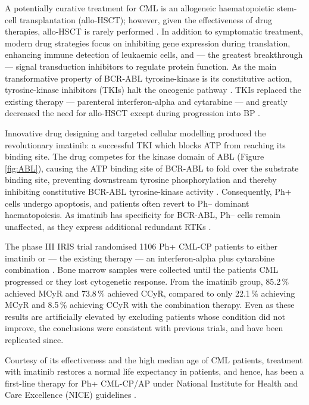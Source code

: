 A potentially curative treatment for CML is an allogeneic haematopoietic stem-cell transplantation (allo-HSCT); however, given the effectiveness of drug therapies, allo-HSCT is rarely performed \citep{RefWorks:doc:583b173fe4b066125b214e79}. In addition to symptomatic treatment, modern drug strategies focus on inhibiting gene expression during translation, enhancing immune detection of leukaemic cells, and --- the greatest breakthrough --- signal transduction inhibitors to regulate protein function. As the main transformative property of BCR-ABL tyrosine-kinase is its constitutive action, tyrosine-kinase inhibitors (TKIs) halt the oncogenic pathway \citep{RefWorks:doc:58309926e4b05b192d72d473}. TKIs replaced the existing therapy --- parenteral interferon-alpha and cytarabine --- and greatly decreased the need for allo-HSCT except during progression into BP \citep{RefWorks:doc:583b5609e4b066125b215900}.

Innovative drug designing and targeted cellular modelling produced the revolutionary imatinib: a successful TKI which blocks ATP from reaching its binding site. The drug competes for the kinase domain of ABL (Figure \ref{fig:ABL}), causing the ATP binding site of BCR-ABL to fold over the substrate binding site, preventing downstream tyrosine phosphorylation and thereby inhibiting constitutive BCR-ABL tyrosine-kinase activity \citep{RefWorks:doc:583b01e7e4b04961d3592edb}. Consequently, Ph+ cells undergo apoptosis, and patients often revert to Ph-- dominant haematopoiesis. As imatinib has specificity for BCR-ABL, Ph-- cells remain unaffected, as they express additional redundant RTKs \citep{RefWorks:doc:583b5731e4b066125b21592c}.

The phase III IRIS trial randomised 1106 Ph+ CML-CP patients to either imatinib or --- the existing therapy --- an interferon-alpha plus cytarabine combination \citep{RefWorks:doc:585b3fdee4b05e0ea0615992}. Bone marrow samples were collected until the patient\textquotesingle s CML progressed or they lost cytogenetic response. From the imatinib group, 85.2\,\% achieved MCyR and 73.8\,\% achieved CCyR, compared to only 22.1\,\% achieving MCyR and 8.5\,\% achieving CCyR with the combination therapy. Even as these results are artificially elevated by excluding patients whose condition did not improve, the conclusions were consistent with previous trials, and have been replicated since.

Courtesy of its effectiveness and the high median age of CML patients, treatment with imatinib restores a normal life expectancy in patients, and hence, has been a first-line therapy for Ph+ CML-CP/AP under National Institute for Health and Care Excellence (NICE) guidelines \citep{RefWorks:doc:583b1deae4b066125b214f4e,RefWorks:doc:583b55b1e4b066125b2158e1}.

